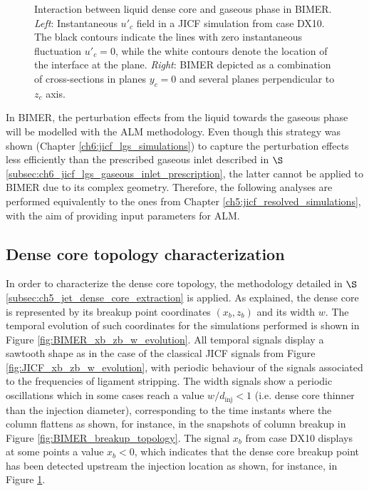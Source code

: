 \begin{figure}[ht]
\centering
{}
\caption[Interaction between liquid dense core and gaseous phase in BIMER]{Interaction between liquid dense core and gaseous phase in BIMER. \textsl{Left}: Instantaneous $u'_c$ field in a JICF simulation from case DX10. The black contours indicate the lines with zero instantaneous fluctuation $u'_c = 0$, while the white contours denote the location of the interface at the plane. \textsl{Right}: BIMER depicted as a combination of cross-sections in planes $y _c= 0$ and several planes perpendicular to $z_c$ axis.}
\label{fig:BIMER_jet_air_interaction_up_and_skeleton}
\end{figure}

In BIMER, the perturbation effects from the liquid towards the gaseous phase will be modelled with the ALM methodology. Even though this strategy was shown (Chapter \ref{ch6:jicf_lgs_simulations}) to capture the perturbation effects less efficiently than the prescribed gaseous inlet described in $\S$\ref{subsec:ch6_jicf_lgs_gaseous_inlet_prescription}, the latter cannot be applied to BIMER due to its complex geometry. Therefore, the following analyses are performed equivalently to the ones from Chapter \ref{ch5:jicf_resolved_simulations}, with the aim of providing input parameters for ALM.



\subsection{Dense core topology characterization}
\label{subsec:ch8_BIMER_DC_topology}

In order to characterize the dense core topology, the methodology detailed in $\S$\ref{subsec:ch5_jet_dense_core_extraction} is applied. As explained, the dense core is represented by its breakup point coordinates $\left( x_b, z_b \right)$ and its width $w$. The temporal evolution of such coordinates for the simulations performed is shown in Figure \ref{fig:BIMER_xb_zb_w_evolution}. All temporal signals display a sawtooth shape as in the case of the classical JICF signals from Figure 
\ref{fig:JICF_xb_zb_w_evolution}, with periodic behaviour of the signals associated to the frequencies of ligament stripping. The width signals show a periodic oscillations which in some cases reach a value $w/d_\mathrm{inj} < 1$ (i.e. dense core thinner than the injection diameter), corresponding to the time instants where the column flattens as shown, for instance, in the snapshots of column breakup in Figure \ref{fig:BIMER_breakup_topology}. The signal $x_b$ from case DX10 displays at some points a value $x_b < 0$, which indicates that the dense core breakup point has been detected upstream the injection location as shown, for instance, in Figure \ref{fig:BIMER_jet_air_interaction_up_and_skeleton}.

